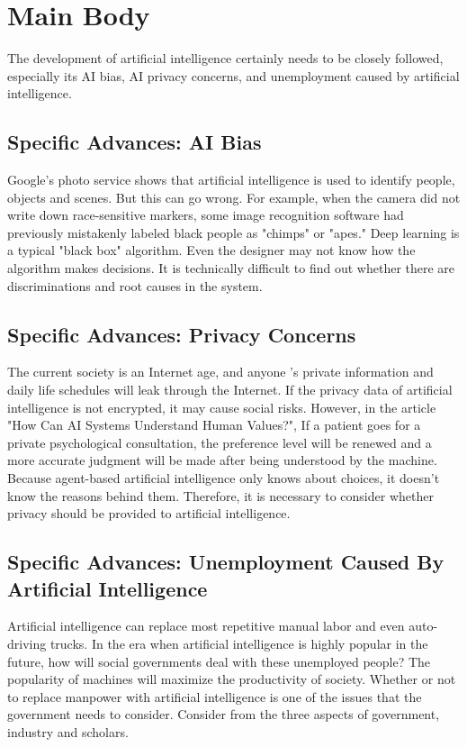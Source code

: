 \documentclass[12pt]{article}  %
\begin{document}
\section{Main Body}
	The development of artificial intelligence certainly needs to be closely followed, especially its AI bias, AI privacy concerns, and unemployment caused by artificial intelligence.
\subsection{Specific Advances: AI Bias}
	Google's photo service shows that artificial intelligence is used to identify people, objects and scenes. But this can go wrong. For example, when the camera did not write down race-sensitive markers, some image recognition software had previously mistakenly labeled black people as "chimps" or "apes." Deep learning is a typical "black box" algorithm. Even the designer may not know how the algorithm makes decisions. It is technically difficult to find out whether there are discriminations and root causes in the system.
\subsection{Specific Advances: Privacy Concerns}
	The current society is an Internet age, and anyone ’s private information and daily life schedules will leak through the Internet. If the privacy data of artificial intelligence is not encrypted, it may cause social risks. However, in the article "How Can AI Systems Understand Human Values?", If a patient goes for a private psychological consultation, the preference level will be renewed and a more accurate judgment will be made after being understood by the machine. Because agent-based artificial intelligence only knows about choices, it doesn't know the reasons behind them. Therefore, it is necessary to consider whether privacy should be provided to artificial intelligence.
\subsection{Specific Advances: Unemployment Caused By Artificial Intelligence}
	Artificial intelligence can replace most repetitive manual labor and even auto-driving trucks. In the era when artificial intelligence is highly popular in the future, how will social governments deal with these unemployed people? The popularity of machines will maximize the productivity of society. Whether or not to replace manpower with artificial intelligence is one of the issues that the government needs to consider.
	Consider from the three aspects of government, industry and scholars.
\end{document}
